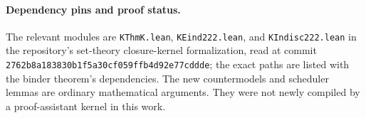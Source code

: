 \paragraph{Dependency pins and proof status.}
The relevant modules are
\texttt{KThmK.lean}, \texttt{KEind222.lean}, and
\texttt{KIndisc222.lean} in the repository's set-theory closure-kernel
formalization, read at commit
\texttt{2762b8a183830b1f5a30cf059ffb4d92e77cddde}; the exact paths are
listed with the binder theorem's dependencies. The new countermodels
and scheduler lemmas are ordinary mathematical arguments. They were
not newly compiled by a proof-assistant kernel in this work.

